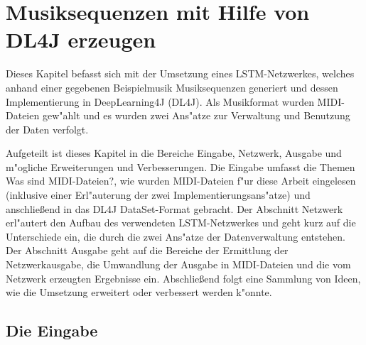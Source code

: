 \chapter{Musiksequenzen mit Hilfe von DL4J erzeugen}
{
Dieses Kapitel befasst sich mit der Umsetzung eines LSTM-Netzwerkes, welches anhand einer gegebenen Beispielmusik Musiksequenzen generiert und dessen Implementierung in DeepLearning4J (DL4J). Als Musikformat wurden MIDI-Dateien gew"ahlt und es wurden zwei Ans"atze zur Verwaltung und Benutzung der Daten verfolgt.

Aufgeteilt ist dieses Kapitel in die Bereiche Eingabe, Netzwerk, Ausgabe und m"ogliche Erweiterungen und Verbesserungen. Die Eingabe umfasst die Themen {\glqq}Was sind MIDI-Dateien?{\grqq}, wie wurden MIDI-Dateien f"ur diese Arbeit eingelesen (inklusive einer Erl"auterung der zwei Implementierungsans"atze) und anschlie{\ss}end in das DL4J DataSet-Format gebracht. Der Abschnitt Netzwerk erl"autert den Aufbau des verwendeten LSTM-Netzwerkes und geht kurz auf die Unterschiede ein, die durch die zwei Ans"atze der Datenverwaltung entstehen. Der Abschnitt Ausgabe geht auf die Bereiche der Ermittlung der Netzwerkausgabe, die Umwandlung der Ausgabe in MIDI-Dateien und die vom Netzwerk erzeugten Ergebnisse ein. Abschlie{\ss}end folgt eine Sammlung von Ideen, wie die Umsetzung erweitert oder verbessert werden k"onnte.


\section{Die Eingabe}

}
